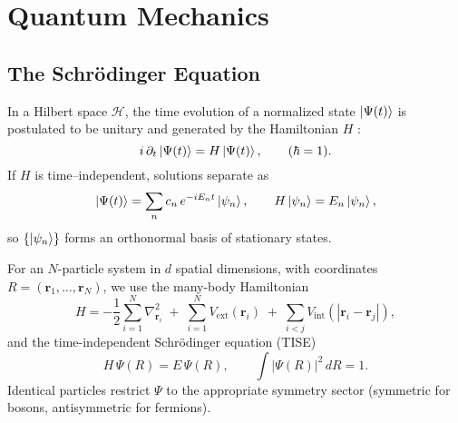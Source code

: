 \section{Quantum Mechanics}
\subsection{The Schrödinger Equation}

In a Hilbert space $\mathcal H$, the time evolution of a normalized state $\ket{\Psi(t)}$ is
postulated to be unitary and generated by the Hamiltonian $H$ \cite{BereraDelDebbio2021-QuantumMechanics,GriffithsSchroeter2018-IntroQM}:
\[
i\,\partial_t \ket{\Psi(t)} = H \ket{\Psi(t)}, \qquad (\hbar=1).
\]
If $H$ is time–independent, solutions separate as
\[
\ket{\Psi(t)}=\sum_n c_n\,e^{-iE_n t}\ket{\psi_n},
\qquad H\ket{\psi_n}=E_n\ket{\psi_n},
\]
so $\{\ket{\psi_n}\}$ forms an orthonormal basis of stationary states.

For an $N$-particle system in $d$ spatial dimensions, with coordinates
$R=(\mathbf r_1,\ldots,\mathbf r_N)$, we use the many-body Hamiltonian
\[
H = -\frac12 \sum_{i=1}^N \nabla_{\mathbf r_i}^2
    \;+\; \sum_{i=1}^N V_{\text{ext}}(\mathbf r_i)
    \;+\; \sum_{i<j} V_{\text{int}}(|\mathbf r_i-\mathbf r_j|),
\]
and the time-independent Schrödinger equation (TISE)
\[
H\,\Psi(R)=E\,\Psi(R), \qquad \int | \Psi(R) |^2\, dR = 1.
\]
Identical particles restrict $\Psi$ to the appropriate symmetry sector (symmetric for bosons,
antisymmetric for fermions).

